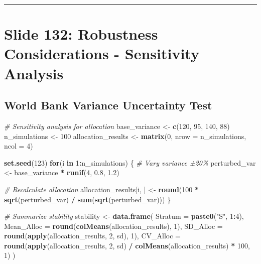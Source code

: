 \documentclass[
]{article}
\newenvironment{Shaded}{\begin{snugshade}}{\end{snugshade}}
\newcommand{\AttributeTok}[1]{\textcolor[rgb]{0.13,0.29,0.53}{#1}}
\newcommand{\CommentTok}[1]{\textcolor[rgb]{0.56,0.35,0.01}{\textit{#1}}}
\newcommand{\ControlFlowTok}[1]{\textcolor[rgb]{0.13,0.29,0.53}{\textbf{#1}}}
\newcommand{\DecValTok}[1]{\textcolor[rgb]{0.00,0.00,0.81}{#1}}
\newcommand{\FloatTok}[1]{\textcolor[rgb]{0.00,0.00,0.81}{#1}}
\newcommand{\FunctionTok}[1]{\textcolor[rgb]{0.13,0.29,0.53}{\textbf{#1}}}
\newcommand{\NormalTok}[1]{#1}
\newcommand{\OtherTok}[1]{\textcolor[rgb]{0.56,0.35,0.01}{#1}}
\newcommand{\SpecialCharTok}[1]{\textcolor[rgb]{0.81,0.36,0.00}{\textbf{#1}}}
\newcommand{\StringTok}[1]{\textcolor[rgb]{0.31,0.60,0.02}{#1}}
\begin{document}
\begin{center}\rule{0.5\linewidth}{0.5pt}\end{center}

\section{Slide 132: Robustness Considerations - Sensitivity
Analysis}\label{slide-132-robustness-considerations---sensitivity-analysis}

\subsection{World Bank Variance Uncertainty
Test}\label{world-bank-variance-uncertainty-test}

\begin{Shaded}
\begin{Highlighting}[]
\CommentTok{\# Sensitivity analysis for allocation}
\NormalTok{base\_variance }\OtherTok{\textless{}{-}} \FunctionTok{c}\NormalTok{(}\DecValTok{120}\NormalTok{, }\DecValTok{95}\NormalTok{, }\DecValTok{140}\NormalTok{, }\DecValTok{88}\NormalTok{)}
\NormalTok{n\_simulations }\OtherTok{\textless{}{-}} \DecValTok{100}
\NormalTok{allocation\_results }\OtherTok{\textless{}{-}} \FunctionTok{matrix}\NormalTok{(}\DecValTok{0}\NormalTok{, }\AttributeTok{nrow =}\NormalTok{ n\_simulations, }\AttributeTok{ncol =} \DecValTok{4}\NormalTok{)}

\FunctionTok{set.seed}\NormalTok{(}\DecValTok{123}\NormalTok{)}
\ControlFlowTok{for}\NormalTok{(i }\ControlFlowTok{in} \DecValTok{1}\SpecialCharTok{:}\NormalTok{n\_simulations) \{}
  \CommentTok{\# Vary variance ±20\%}
\NormalTok{  perturbed\_var }\OtherTok{\textless{}{-}}\NormalTok{ base\_variance }\SpecialCharTok{*} \FunctionTok{runif}\NormalTok{(}\DecValTok{4}\NormalTok{, }\FloatTok{0.8}\NormalTok{, }\FloatTok{1.2}\NormalTok{)}
  
  \CommentTok{\# Recalculate allocation}
\NormalTok{  allocation\_results[i, ] }\OtherTok{\textless{}{-}} \FunctionTok{round}\NormalTok{(}\DecValTok{100} \SpecialCharTok{*} \FunctionTok{sqrt}\NormalTok{(perturbed\_var) }\SpecialCharTok{/} 
                                   \FunctionTok{sum}\NormalTok{(}\FunctionTok{sqrt}\NormalTok{(perturbed\_var)))}
\NormalTok{\}}

\CommentTok{\# Summarize stability}
\NormalTok{stability }\OtherTok{\textless{}{-}} \FunctionTok{data.frame}\NormalTok{(}
  \AttributeTok{Stratum =} \FunctionTok{paste0}\NormalTok{(}\StringTok{"S"}\NormalTok{, }\DecValTok{1}\SpecialCharTok{:}\DecValTok{4}\NormalTok{),}
  \AttributeTok{Mean\_Alloc =} \FunctionTok{round}\NormalTok{(}\FunctionTok{colMeans}\NormalTok{(allocation\_results), }\DecValTok{1}\NormalTok{),}
  \AttributeTok{SD\_Alloc =} \FunctionTok{round}\NormalTok{(}\FunctionTok{apply}\NormalTok{(allocation\_results, }\DecValTok{2}\NormalTok{, sd), }\DecValTok{1}\NormalTok{),}
  \AttributeTok{CV\_Alloc =} \FunctionTok{round}\NormalTok{(}\FunctionTok{apply}\NormalTok{(allocation\_results, }\DecValTok{2}\NormalTok{, sd) }\SpecialCharTok{/} 
                   \FunctionTok{colMeans}\NormalTok{(allocation\_results) }\SpecialCharTok{*} \DecValTok{100}\NormalTok{, }\DecValTok{1}\NormalTok{)}
\NormalTok{)}


\end{Highlighting}
\end{Shaded}
\end{document}
